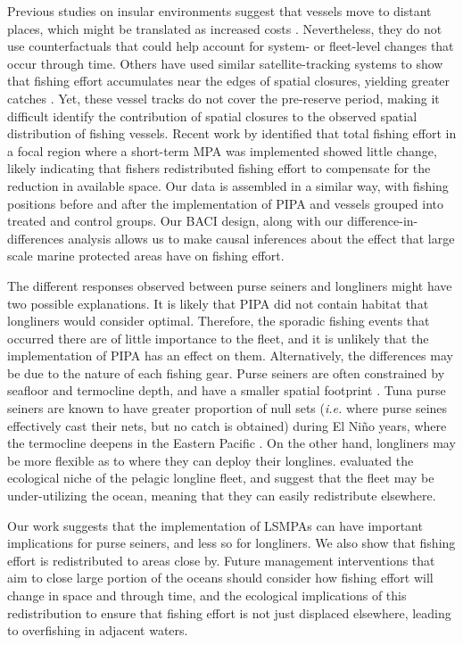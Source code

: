 \documentclass[12pt,]{article}
\begin{document}
Previous studies on insular environments suggest that vessels move to
distant places, which might be translated as increased costs
\citep{stevenson_2013}. Nevertheless, they do not use counterfactuals
that could help account for system- or fleet-level changes that occur
through time. Others have used similar satellite-tracking systems to
show that fishing effort accumulates near the edges of spatial closures,
yielding greater catches \citep{murawski_2005}. Yet, these vessel tracks
do not cover the pre-reserve period, making it difficult identify the
contribution of spatial closures to the observed spatial distribution of
fishing vessels. Recent work by \citet{elahi_2018} identified that total
fishing effort in a focal region where a short-term MPA was implemented
showed little change, likely indicating that fishers redistributed
fishing effort to compensate for the reduction in available space. Our
data is assembled in a similar way, with fishing positions before and
after the implementation of PIPA and vessels grouped into treated and
control groups. Our BACI design, along with our
difference-in-differences analysis allows us to make causal inferences
about the effect that large scale marine protected areas have on fishing
effort.

The different responses observed between purse seiners and longliners
might have two possible explanations. It is likely that PIPA did not
contain habitat that longliners would consider optimal. Therefore, the
sporadic fishing events that occurred there are of little importance to
the fleet, and it is unlikely that the implementation of PIPA has an
effect on them. Alternatively, the differences may be due to the nature
of each fishing gear. Purse seiners are often constrained by seafloor
and termocline depth, and have a smaller spatial footprint
\citep{kroodsma_2018}. Tuna purse seiners are known to have greater
proportion of null sets (\emph{i.e.} where purse seines effectively cast
their nets, but no catch is obtained) during El Niño years, where the
termocline deepens in the Eastern Pacific \citep{dreyfusleon_2015}. On
the other hand, longliners may be more flexible as to where they can
deploy their longlines. \citet{ortuocrespo_2018} evaluated the
ecological niche of the pelagic longline fleet, and suggest that the
fleet may be under-utilizing the ocean, meaning that they can easily
redistribute elsewhere.

Our work suggests that the implementation of LSMPAs can have important
implications for purse seiners, and less so for longliners. We also show
that fishing effort is redistributed to areas close by. Future
management interventions that aim to close large portion of the oceans
should consider how fishing effort will change in space and through
time, and the ecological implications of this redistribution to ensure
that fishing effort is not just displaced elsewhere, leading to
overfishing in adjacent waters.
\end{document}
